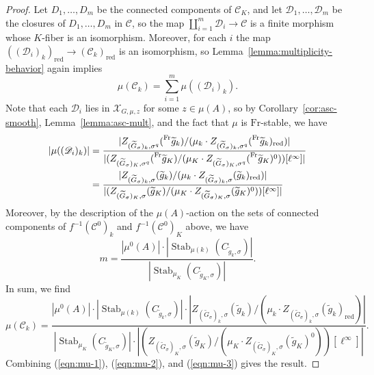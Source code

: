 \documentclass[11pt,reqno]{amsart}
\theoremstyle{definition}
\renewcommand{\rm}{\mathrm}
\newcommand{\sC}{{\mathscr C}}
\newcommand{\sD}{{\mathscr D}}
\newcommand{\sX}{{\mathscr X}}
\DeclareMathOperator{\Stab}{Stab}
\begin{document}
\begin{proof}
    Let $D_1, \dots, D_m$ be the connected components of $\sC_K$, and let $\sD_1, \dots, \sD_m$ be the closures of $D_1, \dots, D_m$ in $\sC$, so the map $\coprod_{i=1}^m \sD_i \to \sC$ is a finite morphism whose $K$-fiber is an isomorphism. Moreover, for each $i$ the map $((\sD_i)_k)_{\rm{red}} \to (\sC_k)_{\rm{red}}$ is an isomorphism, so Lemma~\ref{lemma:multiplicity-behavior} again implies
    \[
    \mu(\sC_k) = \sum_{i=1}^m \mu((\sD_i)_k).
    \]
    Note that each $\sD_i$ lies in $\sX_{G, \mu, z}$ for some $z \in \mu(A)$, so by Corollary~\ref{cor:asc-smooth}, Lemma~\ref{lemma:asc-mult}, and the fact that $\mu$ is $\rm{Fr}$-stable, we have
    \begin{align*}
    |\mu((\sD_i)_k)| &= \frac{|Z_{(\widetilde{G}_\sigma)_k,\sigma^q}(\prescript{\rm{Fr}}{}{\widetilde{g}_k})/(\mu_k \cdot Z_{(\widetilde{G}_\sigma)_k,\sigma^q}(\prescript{\rm{Fr}}{}{\widetilde{g}_k})_{\rm{red}})|}{|(Z_{(\widetilde{G}_\sigma)_K,\sigma^q}(\prescript{\rm{Fr}}{}{\widetilde{g}_K})/(\mu_K \cdot Z_{(\widetilde{G}_\sigma)_K,\sigma^q}(\prescript{\rm{Fr}}{}{\widetilde{g}_K})^0))[\ell^\infty]|} \\
    &= \frac{|Z_{(\widetilde{G}_\sigma)_k,\sigma}(\widetilde{g}_k)/(\mu_k \cdot Z_{(\widetilde{G}_\sigma)_k,\sigma}(\widetilde{g}_k)_{\rm{red}})|}{|(Z_{(\widetilde{G}_\sigma)_K,\sigma}(\widetilde{g}_K)/(\mu_K \cdot Z_{(\widetilde{G}_\sigma)_K,\sigma}(\widetilde{g}_K)^0))[\ell^\infty]|}
    \end{align*}
    Moreover, by the description of the $\mu(A)$-action on the sets of connected components of $f^{-1}(\sC^0)_k$ and $f^{-1}(\sC^0)_K$ above, we have
    \[
    m = \frac{|\mu^0(A)| \cdot |\Stab_{\mu(k)}(C_{\widetilde{g}_k,\sigma})|}{|\Stab_{\mu_K}(C_{\widetilde{g}_K,\sigma})|}.
    \]
    In sum, we find
    \begin{equation}\label{eqn:mu-3}
    \mu(\sC_k) = \frac{|\mu^0(A)| \cdot |\Stab_{\mu(k)}(C_{\widetilde{g}_k,\sigma})| \cdot |Z_{(\widetilde{G}_\sigma)_k,\sigma}(\widetilde{g}_k)/(\mu_k \cdot Z_{(\widetilde{G}_\sigma)_k,\sigma}(\widetilde{g}_k)_{\rm{red}})|}{|\Stab_{\mu_K}(C_{\widetilde{g}_K,\sigma})| \cdot |(Z_{(\widetilde{G}_\sigma)_K,\sigma}(\widetilde{g}_K)/(\mu_K \cdot Z_{(\widetilde{G}_\sigma)_K,\sigma}(\widetilde{g}_K)^0))[\ell^\infty]|}.
    \end{equation}
    Combining (\ref{eqn:mu-1}), (\ref{eqn:mu-2}), and (\ref{eqn:mu-3}) gives the result.
    \end{proof}
    
    
    
\end{document}
